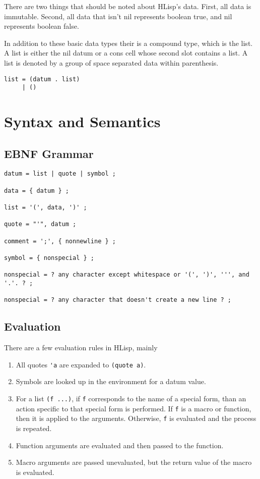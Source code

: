 \documentclass[12pt]{article}
\begin{document}
There are two things that should be noted about HLisp's data. First, all data is
immutable. Second, all data that isn't nil represents boolean true, and nil
represents boolean false.

In addition to these basic data types their is a compound type, which is the
list. A list is either the nil datum or a cons cell whose second slot contains a
list. A list is denoted by a group of space separated data within parenthesis.

\begin{verbatim}
list = (datum . list)
     | ()
\end{verbatim}

\section{Syntax and Semantics}

\subsection{EBNF Grammar}

\begin{verbatim}
datum = list | quote | symbol ;

data = { datum } ;

list = '(', data, ')' ;

quote = "'", datum ;

comment = ';', { nonnewline } ;

symbol = { nonspecial } ;

nonspecial = ? any character except whitespace or '(', ')', ''', and '.'. ? ;

nonspecial = ? any character that doesn't create a new line ? ;
\end{verbatim}

\subsection{Evaluation}

There are a few evaluation rules in HLisp, mainly

\begin{enumerate}
\item All quotes \verb!'a! are expanded to \verb!(quote a)!.

\item Symbols are looked up in the environment for a datum value.

\item For a list \verb!(f ...)!, if \verb!f! corresponds to the name of a
  special form, than an action specific to that special form is performed. If
  \verb!f! is a macro or function, then it is applied to the
  arguments. Otherwise, \verb!f! is evaluated and the process is repeated.

\item Function arguments are evaluated and then passed to the function.

\item Macro arguments are passed unevaluated, but the return value of the macro
  is evaluated.
\end{enumerate}
\end{document}
